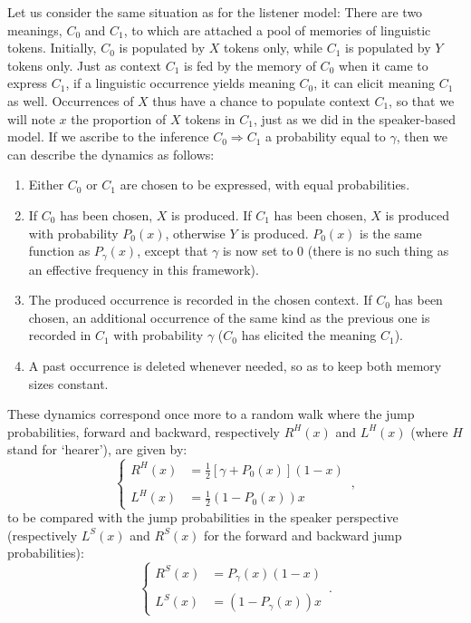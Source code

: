 \documentclass[12pt,twocolumn,amsmath,amssymb,aps,longbibliography]{revtex4-1}  %
\newcommand{\beq}{\begin{equation}}
\newcommand{\eneq}{\end{equation}}
\begin{document}
Let us consider the same situation as for the listener model: There are two meanings, $C_0$ and $C_1$, to which are attached a pool of memories of linguistic tokens. Initially, $C_0$ is populated by $X$ tokens only, while $C_1$ is populated by $Y$ tokens only. Just as context $C_1$ is fed by the memory of $C_0$ when it came to express $C_1$, if a linguistic occurrence yields meaning $C_0$, it can elicit meaning $C_1$ as well. Occurrences of $X$ thus have a chance to populate context $C_1$, so that we will note $x$ the proportion of $X$ tokens in $C_1$, just as we did in the speaker-based model. If we ascribe to the inference $C_0 \Rightarrow C_1$ a probability equal to $\gamma$, then we can describe the dynamics as follows:
\begin{enumerate}
\item Either $C_0$ or $C_1$ are chosen to be expressed, with equal probabilities.
\item If $C_0$ has been chosen, $X$ is produced. If $C_1$ has been chosen, $X$ is produced with probability $P_0(x)$, otherwise $Y$ is produced. $P_0(x)$ is the same function as $P_{\gamma}(x)$, except that $\gamma$ is now set to 0 (there is no such thing as an effective frequency in this framework). 
\item The produced occurrence is recorded in the chosen context. If $C_0$ has been chosen, an additional occurrence of the same kind as the previous one is recorded in $C_1$ with probability $\gamma$ ($C_0$ has elicited the meaning $C_1$). 
\item A past occurrence is deleted whenever needed, so as to keep both memory sizes constant. 
\end{enumerate}

These dynamics correspond once more to a random walk where the jump probabilities, forward and backward,  respectively $R^H(x)$ and $L^H(x)$ (where $H$ stand for `hearer'), are given by: 
\beq
     \begin{cases}
         R^H(x) &= \displaystyle \frac{1}{2}  \left[ \gamma + P_0(x) \right] (1 -x) \\
         \\
         L^H(x) &= \displaystyle \frac{1}{2}  (1 - P_0(x) ) x
     \end{cases} \, ,
\eneq
to be compared with the jump probabilities in the speaker perspective (respectively $L^S(x)$ and $R^S(x)$ for the forward and backward jump probabilities):
\beq
     \begin{cases}
         R^S(x) &= \displaystyle  P_{\gamma}(x) (1 -x)\\
         \\
         L^S(x) &= \displaystyle(1 - P_{\gamma}(x) ) x 
     \end{cases} \, .
\eneq
\end{document}
